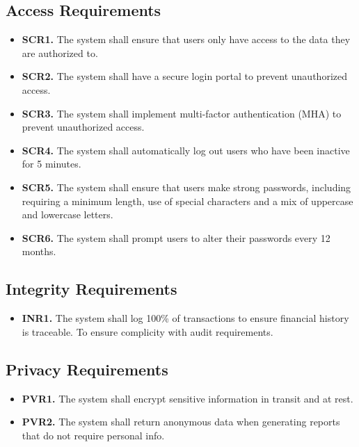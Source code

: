 \documentclass[12pt]{article}
\begin{document}
\subsection{Access Requirements}

\label{SCR}

\begin{itemize}
    \item \textbf{SCR1.} The system shall ensure that users only have access to the data they are authorized to.
    \item \textbf{SCR2.} The system shall have a secure login portal to prevent unauthorized access.
    \item \textbf{SCR3.} The system shall implement multi-factor authentication (MHA) to prevent unauthorized access.
    \item \textbf{SCR4.} The system shall automatically log out users who have been inactive for 5 minutes.
    \item \textbf{SCR5.} The system shall ensure that users make strong passwords, including requiring a minimum length, use of special characters and a mix of uppercase and lowercase letters.
    \item \textbf{SCR6.} The system shall prompt users to alter their passwords every 12 months.
\end{itemize}

\subsection{Integrity Requirements}

\label{INR}

\begin{itemize}
    \item \textbf{INR1.} The system shall log 100\% of transactions to ensure financial history is traceable. To ensure complicity with audit requirements.
\end{itemize}
\subsection{Privacy Requirements}

\label{PVR}

\begin{itemize}
    \item \textbf{PVR1.} The system shall encrypt sensitive information in transit and at rest.
    \item \textbf{PVR2.} The system shall return anonymous data when generating reports that do not require personal info.
\end{itemize}
\end{document}
